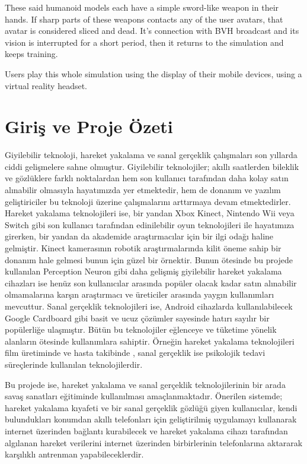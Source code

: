 \documentclass[a4paper, 12pt, titlepage]{article}
\begin{document}
These said humanoid models each have a simple sword-like weapon in their hands. If sharp parts of
these weapons contacts any of the user avatars, that avatar is considered sliced and dead. It’s
connection with BVH broadcast and its vision is interrupted for a short period, then it returns to
the simulation and keeps training.

Users play this whole simulation using the display of their mobile devices, using a virtual reality
headset.

\newpage
\renewcommand*\contentsname{İçindekiler}
\tableofcontents
\newpage

\section{Giriş ve Proje Özeti}
Giyilebilir teknoloji, hareket yakalama ve sanal gerçeklik çalışmaları son yıllarda ciddi
gelişmelere sahne olmuştur. Giyilebilir teknolojiler; akıllı saatlerden bileklik ve gözlüklere
farklı noktalardan hem son kullanıcı tarafından daha kolay satın alınabilir olmasıyla hayatımızda
yer etmektedir, hem de donanım ve yazılım geliştiriciler bu teknoloji üzerine çalışmalarını
arttırmaya devam etmektedirler. Hareket yakalama teknolojileri ise, bir yandan Xbox Kinect,
Nintendo Wii veya Switch gibi son kullanıcı tarafından edinilebilir oyun teknolojileri ile
hayatımıza girerken, bir yandan da akademide araştırmacılar için bir ilgi odağı haline gelmiştir.
Kinect kamerasının robotik araştırmalarında kilit öneme sahip bir donanım hale gelmesi bunun için
güzel bir örnektir. Bunun ötesinde bu projede kullanılan Perception Neuron gibi daha gelişmiş
giyilebilir hareket yakalama cihazları ise henüz son kullanıcılar arasında popüler olacak kadar
satın alınabilir olmamalarına karşın araştırmacı ve üreticiler arasında yaygın kullanımları
mevcuttur. Sanal gerçeklik teknolojileri ise, Android cihazlarda kullanılabilecek Google Cardboard
gibi basit ve ucuz çözümler sayesinde hatırı sayılır bir popülerliğe ulaşmıştır. Bütün bu
teknolojiler eğlenceye ve tüketime yönelik alanların ötesinde kullanımlara sahiptir. Örneğin
hareket yakalama teknolojileri film üretiminde ve hasta takibinde \cite{edseee.660756620130101},
sanal gerçeklik ise psikolojik tedavi süreçlerinde \cite{edseee.743857520160101} kullanılan
teknolojilerdir.

Bu projede ise, hareket yakalama ve sanal gerçeklik teknolojilerinin bir arada savaş sanatları
eğitiminde kullanılması amaçlanmaktadır. Önerilen sistemde; hareket yakalama
kıyafeti ve bir sanal gerçeklik gözlüğü giyen kullanıcılar, kendi bulundukları konumdan
akıllı telefonları için geliştirilmiş uygulamayı kullanarak internet üzerinden bağlantı
kurabilecek ve hareket yakalama cihazı tarafından algılanan hareket verilerini internet üzerinden
birbirlerinin telefonlarına aktararak karşılıklı antrenman yapabileceklerdir.
\end{document}
